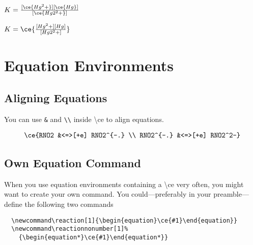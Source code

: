 \documentclass[a4paper,notitlepage,parskip=half]{scrreprt}
\newcommand\macro[1]{{\ttfamily\textbackslash#1}}
\begin{document}
\begin{Example}[xrightmargin=5cm]
  $K = \frac{[\ce{Hg^2+}][\ce{Hg}]}{[\ce{Hg2^2+}]}$
\end{Example}

\begin{Example}[xrightmargin=5cm]
  $K = \ce{\frac{[Hg^2+][Hg]}{[Hg2^2+]}}$
\end{Example}

\begin{Example}[xrightmargin=5cm]
\end{Example}



\section{Equation Environments}

\subsection{Aligning Equations}

You can use \verb|&| and \verb|\\| inside \macro{ce} to align equations.

\begin{SideBySideExample}[xrightmargin=5cm]
  \begin{align*}
    \ce{RNO2 &<=>[+e] RNO2^{-.} \\
         RNO2^{-.} &<=>[+e] RNO2^2-}
  \end{align*}
\end{SideBySideExample}


\subsection{Own Equation Command}

When you use equation environments containing a \macro{ce} very often, you might want to create your own command. You could---preferably in your preamble---define the following two commands

\begin{Verbatim}
  \newcommand\reaction[1]{\begin{equation}\ce{#1}\end{equation}}
  \newcommand\reactionnonumber[1]%
    {\begin{equation*}\ce{#1}\end{equation*}}
\end{Verbatim}
\end{document}
